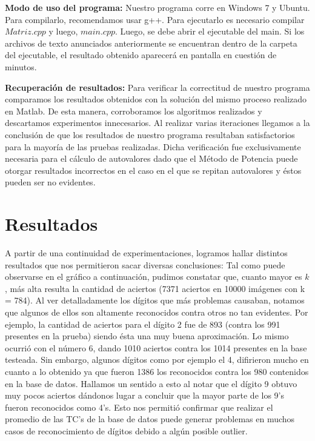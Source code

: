 \documentclass[10pt, a4paper]{article}
\begin{document}
\large{\textbf{Modo de uso del programa:}} 
Nuestro programa corre en Windows 7 y Ubuntu. Para compilarlo, recomendamos usar g++. Para ejecutarlo es necesario compilar $Matriz.cpp$ y luego, $main.cpp$. Luego, se debe abrir el ejecutable del main. Si los archivos de texto anunciados anteriormente se encuentran dentro de la carpeta del ejecutable, el resultado obtenido aparecerá en pantalla en cuestión de minutos.\newline 

\large{\textbf{Recuperaci\'on de resultados:}} Para verificar la correctitud de nuestro programa comparamos los resultados obtenidos con la solución del mismo proceso realizado en Matlab. De esta manera, corroboramos los algoritmos realizados y descartamos experimentos innecesarios. Al realizar varias iteraciones llegamos a la conclusi\'on de que los resultados de nuestro programa resultaban satisfactorios para la mayor\'ia de las pruebas realizadas. Dicha verificación fue exclusivamente necesaria para el cálculo de autovalores dado que el Método de Potencia puede otorgar resultados incorrectos en el caso en el que se repitan autovalores y éstos pueden ser no evidentes.\newline

\section{Resultados}
A partir de una continuidad de experimentaciones, logramos hallar distintos resultados que nos permitieron sacar diversas conclusiones:\newline
Tal como puede observarse en el gráfico a continuación, pudimos constatar que, cuanto mayor es $k$, más alta resulta la cantidad de aciertos (7371 aciertos en 10000 imágenes con k = 784). Al ver detalladamente los dígitos que más problemas causaban, notamos que algunos de ellos son altamente reconocidos contra otros no tan evidentes. Por ejemplo, la cantidad de aciertos para el dígito 2 fue de 893 (contra los 991 presentes en la prueba) siendo ésta una muy buena aproximación. Lo mismo ocurrió con el número 6, dando 1010 aciertos contra los 1014 presentes en la base testeada. Sin embargo, algunos dígitos como por ejemplo el 4, difirieron mucho en cuanto a lo obtenido ya que fueron 1386 los reconocidos contra los 980 contenidos en la base de datos. Hallamos un sentido a esto al notar que el dígito 9 obtuvo muy pocos aciertos dándonos lugar a concluir que la mayor parte de los 9's fueron reconocidos como 4's. Esto nos permitió confirmar que realizar el promedio de las TC's de la base de datos puede generar problemas en muchos casos de reconocimiento de dígitos debido a algún posible outlier.\newline
\end{document}
